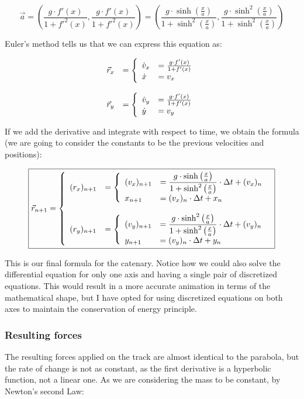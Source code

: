 \documentclass[12pt,twoside,a4paper]{article}
\newcommand{\ds}{\displaystyle}
\begin{document}
	$$\vec{a} = \left(\frac{g \cdot f'(x)}{1 + f'^2(x)}, \frac{g \cdot f'(x)}{1 + f'^2(x)}\right) = \left(\frac{g \cdot \sinh{\left(\frac{x}{a}\right)}}{1 + \sinh^2{\left(\frac{x}{a}\right)}}, \frac{g \cdot \sinh^2{\left(\frac{x}{a}\right)}}{1 + \sinh^2{\left(\frac{x}{a}\right)}}\right)$$
	
	Euler's method tells us that we can express this equation as:
	
	$$\begin{array}{ll}
		\vec{r}_x &= \left\{\begin{array}{ll}
			\ds \dot v_x &= \frac{g \cdot f'(x)}{1 + f'(x)} \cr
			\ds \dot x &= v_x
		\end{array}\right. \cr \cr
		\vec{r}_y &= \left\{\begin{array}{ll}
			\ds \dot v_y &= \frac{g \cdot f'(x)}{1 + f'(x)} \cr
			\ds \dot y &= v_y
		\end{array}\right.
	\end{array}$$

	If we add the derivative and integrate with respect to time, we obtain the formula (we are going to consider the constants to be the previous velocities and positions):
	
	$$\boxed{\vec{r}_{n + 1} = 
	\left\{\begin{array}{ll}
		(r_x)_{n + 1} &=
		\left\{\begin{array}{ll}
			\ds (v_x)_{n + 1} &= \dfrac{g \cdot \sinh{\left(\frac{x}{a}\right)}}{1 + \sinh^2{\left(\frac{x}{a}\right)}} \cdot \Delta t + (v_x)_n \cr
			\ds x_{n + 1} &= (v_x)_n \cdot \Delta t + x_n
		\end{array}\right. \cr \cr
		(r_y)_{n + 1} &=
		\left\{\begin{array}{ll}
			\ds (v_y)_{n + 1} &= \dfrac{g \cdot \sinh^2{\left(\frac{x}{a}\right)}}{1 + \sinh^2{\left(\frac{x}{a}\right)}} \cdot \Delta t + (v_y)_n \cr
			\ds y_{n+1} &= (v_y)_n \cdot \Delta t + y_n
		\end{array}\right.
	\end{array}\right.}$$

	This is our final formula for the catenary. Notice how we could also solve the differential equation for only one axis and having a single pair of discretized equations. This would result in a more accurate animation in terms of the mathematical shape, but I have opted for using discretized equations on both axes to maintain the conservation of energy principle.
	
	\subsubsection{Resulting forces}
	The resulting forces applied on the track are almost identical to the parabola, but the rate of change is not as constant, as the first derivative is a hyperbolic function, not a linear one. As we are considering the mass to be constant, by Newton's second Law:
	
\end{document}

